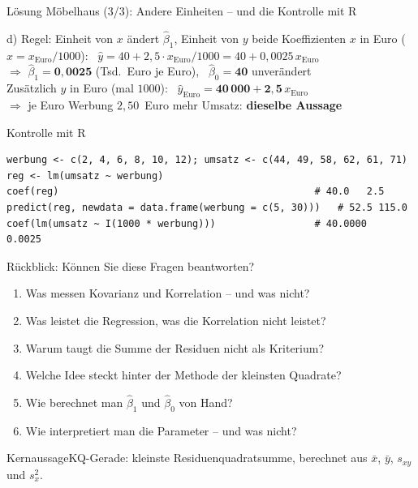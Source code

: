\documentclass[aspectratio=169,11pt]{beamer}
\newcommand{\kernaussage}[1]{\begin{alertblock}{Kernaussage}#1\end{alertblock}}
\begin{document}
\begin{frame}[fragile]{Lösung Möbelhaus (3/3): Andere Einheiten -- und die Kontrolle mit R}
  \small\lstset{basicstyle=\ttfamily\footnotesize,aboveskip=2pt,belowskip=2pt}
  \begin{block}{d) Regel: Einheit von $x$ ändert $\hat{\beta}_1$, Einheit von $y$ beide Koeffizienten}
    \vspace{-2pt}
    $x$ in Euro ($x = x_{\text{Euro}}/1000$): \ $\hat{y} = 40 + 2{,}5 \cdot x_{\text{Euro}}/1000 = 40 + 0{,}0025\,x_{\text{Euro}}$\\
    $\Rightarrow$ $\hat{\beta}_1 = \mathbf{0{,}0025}$ (Tsd.~Euro je Euro), \ $\hat{\beta}_0 = \mathbf{40}$ unverändert\\[2pt]
    Zusätzlich $y$ in Euro (mal $1000$): \ $\hat{y}_{\text{Euro}} = \mathbf{40\,000} + \mathbf{2{,}5}\,x_{\text{Euro}}$\\
    $\Rightarrow$ je Euro Werbung $2{,}50$~Euro mehr Umsatz: \textbf{dieselbe Aussage}
  \end{block}

  \begin{exampleblock}{Kontrolle mit R}
\begin{lstlisting}
werbung <- c(2, 4, 6, 8, 10, 12); umsatz <- c(44, 49, 58, 62, 61, 71)
reg <- lm(umsatz ~ werbung)
coef(reg)                                            # 40.0   2.5
predict(reg, newdata = data.frame(werbung = c(5, 30)))   # 52.5 115.0
coef(lm(umsatz ~ I(1000 * werbung)))                 # 40.0000   0.0025
\end{lstlisting}
  \end{exampleblock}

\end{frame}

\begin{frame}{Rückblick: Können Sie diese Fragen beantworten?}
  \begin{enumerate}
    \setlength{\itemsep}{5pt}
    \item Was messen Kovarianz und Korrelation -- und was nicht?
    \item Was leistet die Regression, was die Korrelation nicht leistet?
    \item Warum taugt die Summe der Residuen nicht als Kriterium?
    \item Welche Idee steckt hinter der Methode der kleinsten Quadrate?
    \item Wie berechnet man $\hat{\beta}_1$ und $\hat{\beta}_0$ von Hand?
    \item Wie interpretiert man die Parameter -- und was nicht?
  \end{enumerate}

  \medskip

  \kernaussage{KQ-Gerade: kleinste Residuenquadratsumme, berechnet aus $\bar{x}$,
    $\bar{y}$, $s_{xy}$ und $s_x^{2}$.}
\end{frame}
\end{document}
